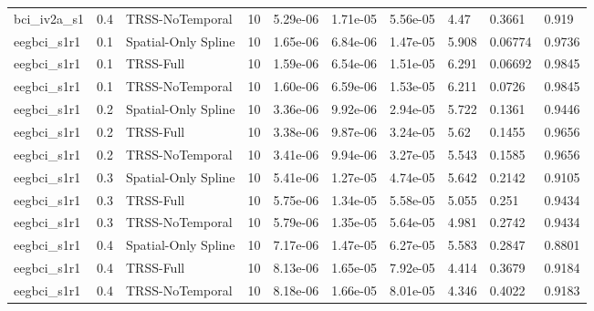 \begin{landscape}
\begin{longtable}{p{}p{}p{}p{}p{}p{}p{}p{}p{}p{}}
bci\_iv2a\_s1 & 0.4 & TRSS-NoTemporal & 10 & 5.29e-06 & 1.71e-05 & 5.56e-05 & 4.47 & 0.3661 & 0.919 \\
eegbci\_s1r1 & 0.1 & Spatial-Only Spline & 10 & 1.65e-06 & 6.84e-06 & 1.47e-05 & 5.908 & 0.06774 & 0.9736 \\
eegbci\_s1r1 & 0.1 & TRSS-Full & 10 & 1.59e-06 & 6.54e-06 & 1.51e-05 & 6.291 & 0.06692 & 0.9845 \\
eegbci\_s1r1 & 0.1 & TRSS-NoTemporal & 10 & 1.60e-06 & 6.59e-06 & 1.53e-05 & 6.211 & 0.0726 & 0.9845 \\
eegbci\_s1r1 & 0.2 & Spatial-Only Spline & 10 & 3.36e-06 & 9.92e-06 & 2.94e-05 & 5.722 & 0.1361 & 0.9446 \\
eegbci\_s1r1 & 0.2 & TRSS-Full & 10 & 3.38e-06 & 9.87e-06 & 3.24e-05 & 5.62 & 0.1455 & 0.9656 \\
eegbci\_s1r1 & 0.2 & TRSS-NoTemporal & 10 & 3.41e-06 & 9.94e-06 & 3.27e-05 & 5.543 & 0.1585 & 0.9656 \\
eegbci\_s1r1 & 0.3 & Spatial-Only Spline & 10 & 5.41e-06 & 1.27e-05 & 4.74e-05 & 5.642 & 0.2142 & 0.9105 \\
eegbci\_s1r1 & 0.3 & TRSS-Full & 10 & 5.75e-06 & 1.34e-05 & 5.58e-05 & 5.055 & 0.251 & 0.9434 \\
eegbci\_s1r1 & 0.3 & TRSS-NoTemporal & 10 & 5.79e-06 & 1.35e-05 & 5.64e-05 & 4.981 & 0.2742 & 0.9434 \\
eegbci\_s1r1 & 0.4 & Spatial-Only Spline & 10 & 7.17e-06 & 1.47e-05 & 6.27e-05 & 5.583 & 0.2847 & 0.8801 \\
eegbci\_s1r1 & 0.4 & TRSS-Full & 10 & 8.13e-06 & 1.65e-05 & 7.92e-05 & 4.414 & 0.3679 & 0.9184 \\
eegbci\_s1r1 & 0.4 & TRSS-NoTemporal & 10 & 8.18e-06 & 1.66e-05 & 8.01e-05 & 4.346 & 0.4022 & 0.9183 \\
\bottomrule
\end{longtable}
\normalsize
\end{landscape}
